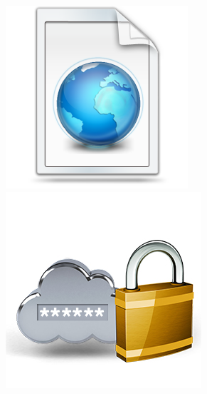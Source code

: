 \begin{frame}
\begin{columns}
    \begin{column}{0.2\textwidth}
      \includegraphics[width=.9\textwidth]{images/webpage}\\
      \bigskip
      \includegraphics[width=.9\textwidth]{images/authentication}
    \end{column}
  \end{columns}
\end{frame}
